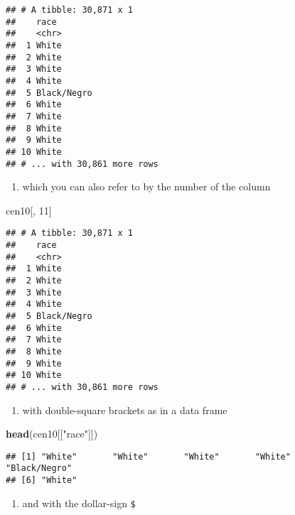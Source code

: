 \documentclass[]{book}
\newenvironment{Shaded}{\begin{snugshade}}{\end{snugshade}}
\newcommand{\KeywordTok}[1]{\textcolor[rgb]{0.13,0.29,0.53}{\textbf{#1}}}
\newcommand{\DecValTok}[1]{\textcolor[rgb]{0.00,0.00,0.81}{#1}}
\newcommand{\StringTok}[1]{\textcolor[rgb]{0.31,0.60,0.02}{#1}}
\newcommand{\NormalTok}[1]{#1}
\providecommand{\tightlist}{%
  \setlength{\itemsep}{0pt}\setlength{\parskip}{0pt}}
\theoremstyle{definition}
\theoremstyle{definition}
\theoremstyle{definition}
\theoremstyle{remark}
\begin{document}
\begin{verbatim}
## # A tibble: 30,871 x 1
##    race       
##    <chr>      
##  1 White      
##  2 White      
##  3 White      
##  4 White      
##  5 Black/Negro
##  6 White      
##  7 White      
##  8 White      
##  9 White      
## 10 White      
## # ... with 30,861 more rows
\end{verbatim}

\begin{enumerate}
\def\labelenumi{\arabic{enumi}.}
\setcounter{enumi}{1}
\tightlist
\item
  which you can also refer to by the number of the column
\end{enumerate}

\begin{Shaded}
\begin{Highlighting}[]
\NormalTok{cen10[, }\DecValTok{11}\NormalTok{]}
\end{Highlighting}
\end{Shaded}

\begin{verbatim}
## # A tibble: 30,871 x 1
##    race       
##    <chr>      
##  1 White      
##  2 White      
##  3 White      
##  4 White      
##  5 Black/Negro
##  6 White      
##  7 White      
##  8 White      
##  9 White      
## 10 White      
## # ... with 30,861 more rows
\end{verbatim}

\begin{enumerate}
\def\labelenumi{\arabic{enumi}.}
\setcounter{enumi}{2}
\tightlist
\item
  with double-square brackets as in a data frame
\end{enumerate}

\begin{Shaded}
\begin{Highlighting}[]
\KeywordTok{head}\NormalTok{(cen10[[}\StringTok{"race"}\NormalTok{]])}
\end{Highlighting}
\end{Shaded}

\begin{verbatim}
## [1] "White"       "White"       "White"       "White"       "Black/Negro"
## [6] "White"
\end{verbatim}

\begin{enumerate}
\def\labelenumi{\arabic{enumi}.}
\setcounter{enumi}{3}
\tightlist
\item
  and with the dollar-sign \texttt{\$}
\end{enumerate}
\end{document}
